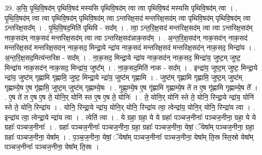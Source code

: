 \documentclass[17pt]{extarticle}
\begin{document}
39. अ॒सि॒ पृ॒थि॒वि॒षद॑म् पृथिवि॒षद॑ मस्यसि पृथिवि॒षद॑म् त्वा त्वा पृथिवि॒षद॑ मस्यसि पृथिवि॒षद॑म् त्वा । . पृ॒थि॒वि॒षद॑म् त्वा त्वा पृथिवि॒षद॑म् पृथिवि॒षद॑म् त्वा ऽन्तरिक्ष॒सद॑ मन्तरिक्ष॒सद॑म् त्वा पृथिवि॒षद॑म् पृथिवि॒षद॑म् त्वा ऽन्तरिक्ष॒सद᳚म् । . पृ॒थि॒वि॒षद॒मिति॑ पृथिवि - सद᳚म् । . त्वा॒ ऽन्त॒रि॒क्ष॒सद॑ मन्तरिक्ष॒सद॑म् त्वा त्वा ऽन्तरिक्ष॒सद॑म् नाक॒सद॑म् नाक॒सद॑ मन्तरिक्ष॒सद॑म् त्वा त्वा ऽन्तरिक्ष॒सद॑न्नाक॒सद᳚म् । . अ॒न्त॒रि॒क्ष॒सद॑न् नाक॒सद॑न् नाक॒सद॑ मन्तरिक्ष॒सद॑ मन्तरिक्ष॒सदन् नाक॒सद॒ मिन्द्रा॒ये न्द्रा॑य नाक॒सद॑ मन्तरिक्ष॒सद॑ मन्तरिक्ष॒सद॑न् नाक॒सद॒ मिन्द्रा॑य । . अ॒न्त॒रि॒क्ष॒सद॒मित्य॑न्तरिक्ष - सद᳚म् । . ना॒क॒सद॒ मिन्द्रा॒ये न्द्रा॑य नाक॒सद॑न् नाक॒सद॒ मिन्द्रा॑य॒ जुष्ट॒म् जुष्ट॒ मिन्द्रा॑य नाक॒सद॑न् नाक॒सद॒ मिन्द्रा॑य॒ जुष्ट᳚म् । . ना॒क॒सद॒मिति॑ नाक - सद᳚म् । . इन्द्रा॑य॒ जुष्ट॒म् जुष्ट॒ मिन्द्रा॒ये न्द्रा॑य॒ जुष्ट॑म् गृह्णामि गृह्णामि॒ जुष्ट॒ मिन्द्रा॒ये न्द्रा॑य॒ जुष्ट॑म् गृह्णामि । . जुष्ट॑म् गृह्णामि गृह्णामि॒ जुष्ट॒म् जुष्ट॑म् गृह्णाम्ये॒ष ए॒ष गृ॑ह्णामि॒ जुष्ट॒म् जुष्ट॑म् गृह्णाम्ये॒षः । . गृ॒ह्णा॒म्ये॒ष ए॒ष गृ॑ह्णामि गृह्णाम्ये॒ष ते॑ त ए॒ष गृ॑ह्णामि गृह्णाम्ये॒ष ते᳚ । . ए॒ष ते॑ त ए॒ष ए॒ष ते॒ योनि॒र् योनि॑ स्त ए॒ष ए॒ष ते॒ योनिः॑ । . ते॒ योनि॒र् योनि॑ स्ते ते॒ योनि॒ रिन्द्रा॒ये न्द्रा॑य॒ योनि॑ स्ते ते॒ योनि॒ रिन्द्रा॑य । . योनि॒ रिन्द्रा॒ये न्द्रा॑य॒ योनि॒र् योनि॒ रिन्द्रा॑य त्वा॒ त्वेन्द्रा॑य॒ योनि॒र् योनि॒ रिन्द्रा॑य त्वा । . इन्द्रा॑य त्वा॒ त्वेन्द्रा॒ये न्द्रा॑य त्वा । . त्वेति॑ त्वा । . ये ग्रहा॒ ग्रहा॒ ये ये ग्रहाः᳚ पञ्चज॒नीनाः᳚ पञ्चज॒नीना॒ ग्रहा॒ ये ये ग्रहाः᳚ पञ्चज॒नीनाः᳚ । . ग्रहाः᳚ पञ्चज॒नीनाः᳚ पञ्चज॒नीना॒ ग्रहा॒ ग्रहाः᳚ पञ्चज॒नीना॒ येषां॒ ॅयेषा᳚म् पञ्चज॒नीना॒ ग्रहा॒ ग्रहाः᳚ पञ्चज॒नीना॒ येषा᳚म् । . प॒ञ्च॒ज॒नीना॒ येषां॒ ॅयेषा᳚म् पञ्चज॒नीनाः᳚ पञ्चज॒नीना॒ येषा᳚म् ति॒स्र स्ति॒स्रो येषा᳚म् पञ्चज॒नीनाः᳚ पञ्चज॒नीना॒ येषा᳚म् ति॒स्रः । \newline
\end{document}
